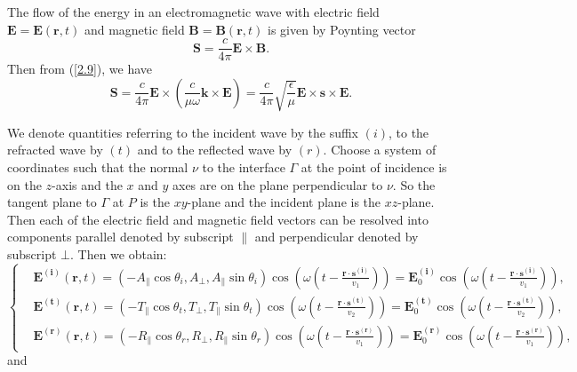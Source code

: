 \documentclass[a4paper,12pt,]{article}
\numberwithin{equation}{section}
\numberwithin{equation}{section} \allowdisplaybreaks
\begin{document}
The flow of the energy in an electromagnetic wave with electric field $\mathbf{E} = \mathbf{E}(\mathbf{r},t)$ and magnetic field $\mathbf{B} = \mathbf{B}(\mathbf{r},t)$ is given by Poynting vector
\begin{equation}\label{2.10}
  \mathbf{S} = \frac{c}{4\pi}\mathbf{E} \times \mathbf{B}.
\end{equation}
Then from (\ref{2.9}), we have
\begin{equation}\label{2.11}
  \mathbf{S} = \frac{c}{4\pi}\mathbf{E} \times (\frac{c}{\mu \omega} \mathbf{k} \times \mathbf{E}) = \frac{c}{4\pi} \sqrt{\frac{\epsilon}{\mu}}  \mathbf{E} \times \mathbf{s} \times \mathbf{E}.
\end{equation}

We denote quantities referring to the incident wave by the suffix $(i)$, to the refracted wave by $(t)$ and to the reflected wave by $(r)$. Choose a system of coordinates such that the normal $\nu$ to the interface $\Gamma$ at the point of incidence is on the $z$-axis and the $x$ and $y$ axes are on the plane perpendicular to $\nu$. So the tangent plane to $\Gamma$ at $P$ is the $xy$-plane and the incident plane is the $xz$-plane. Then each of the electric field and magnetic field vectors can be resolved into components parallel denoted by subscript $\parallel$ and perpendicular denoted by subscript $\bot$. Then we obtain:
\begin{equation*}
  \left\{
  \begin{split}
       & \mathbf{E}^{(\mathbf{i})}(\mathbf{r},t) = (-A_{\parallel}\cos\theta_{i} , A_{\bot} , A_{\parallel}\sin\theta_{i}) \cos(\omega(t - \frac{\mathbf{r} \cdot \mathbf{s^{(i)}}}{v_{1}})) = \mathbf{E}_{0}^{(\mathbf{i})} \cos(\omega(t - \frac{\mathbf{r} \cdot \mathbf{s^{(i)}}}{v_{1}})), \\
       & \mathbf{E}^{(\mathbf{t})}(\mathbf{r},t) = (-T_{\parallel}\cos\theta_{t} , T_{\bot} , T_{\parallel}\sin\theta_{t}) \cos(\omega(t - \frac{\mathbf{r} \cdot \mathbf{s^{(t)}}}{v_{2}})) = \mathbf{E}_{0}^{(\mathbf{t})} \cos(\omega(t - \frac{\mathbf{r} \cdot \mathbf{s^{(t)}}}{v_{2}})), \\
       & \mathbf{E}^{(\mathbf{r})}(\mathbf{r},t) = (-R_{\parallel}\cos\theta_{r} , R_{\bot} , R_{\parallel}\sin\theta_{r}) \cos(\omega(t - \frac{\mathbf{r} \cdot \mathbf{s^{(r)}}}{v_{1}})) = \mathbf{E}_{0}^{(\mathbf{r})} \cos(\omega(t - \frac{\mathbf{r} \cdot \mathbf{s^{(r)}}}{v_{1}})),
  \end{split}
  \right.
\end{equation*}
and
\end{document}
